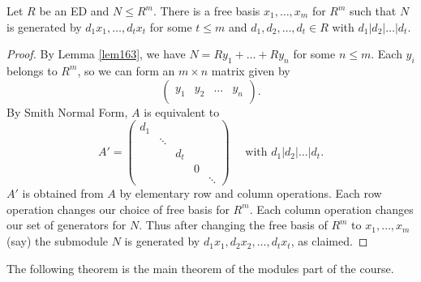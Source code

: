 \documentclass[egregdoesnotlikesansseriftitles,a4paper]{scrartcl}
\begin{document}
\begin{theorem}
        Let $R$ be an ED and $N \leq R^{m}$. There is a free basis $x_1 , \ldots, x_{m}$ for $R^{m}$ such that $N$ is generated by $d_1 x_1 , \ldots, d_{t}x_{t}$ for some $t \leq m$ and $d_1 ,d_2 , \ldots, d_{t}\in R$ with $d_1 | d_2 | \ldots |d_{t}$. 
        \begin{proof}
                By Lemma \ref{lem163}, we have $N =R y_1 + \ldots+ R y_n$ for some $n \leq m$. Each $y_{i}$ belongs to $R^{m}$, so we can form an $m \times n$ matrix given by 
                \[
                \left(
                \begin{array}{c|c|c|c}
                     &&&\\
                     y_1 & y_2 & \ldots & y_{n}\\
                     &&&
                     \end{array}
                \right)
                .\] 
                By Smith Normal Form, $A$ is equivalent to \[
                A' = \begin{pmatrix} d_1 & & & &\\ & \ddots& & &\\ && d_{t}&&\\ &&&0& \\ &&&&\ddots\end{pmatrix} \quad \text{ with } d_1 | d_2 | \ldots| d_{t}
                .\] $A'$ is obtained from $A$ by elementary row and column operations. Each row operation changes our choice of free basis for $R^{m}$. Each column operation changes our set of generators for $N$. Thus after changing the free basis of $R^{m}$ to $x_1 , \ldots, x_{m}$ (say) the submodule $N$ is generated by $d_1 x_1 , d_2 x_2 , \ldots, d_{t}x_{t}$, as claimed.
        \end{proof}
\end{theorem}
The following theorem is the main theorem of the modules part of the course.
\end{document}
